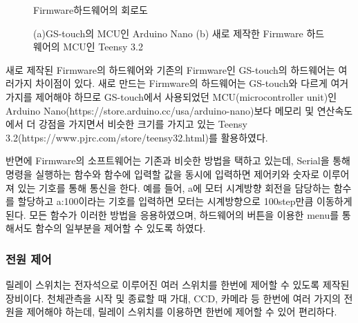 
\begin{figure}[h]
	\begin{center}
	\end{center}
	\caption{Firmware하드웨어의 회로도}
	\label{circuit01}
\end{figure}

\begin{figure}[ht]
	\begin{center}
	\end{center}
\caption{(a)GS-touch의 MCU인 Arduino Nano (b) 새로 제작한 Firmware 하드웨어의 MCU인 Teensy 3.2}
\label{mcu}
\end{figure}

새로 제작된 Firmware의 하드웨어와 기존의 Firmware인 GS-touch의 하드웨어는 여러가지 차이점이 있다. 새로 만드는 Firmware의 하드웨어는 GS-touch와 다르게 여거가지를 제어해야 하므로 GS-touch에서 사용되었던 MCU(microcontroller unit)인 Arduino Nano(https://store.arduino.cc/usa/arduino-nano)보다 메모리 및 연산속도에서 더 강점을 가지면서 비슷한 크기를 가지고 있는 Teensy 3.2(https://www.pjrc.com/store/teensy32.html)를 활용하였다. 

반면에 Firmware의 소프트웨어는 기존과 비슷한 방법을 택하고 있는데, Serial을 통해 명령을 실행하는 함수와 함수에 입력할 값을 동시에 입력하면 제어키와 숫자로 이루어져 있는 기호를 통해 통신을 한다. 예를 들어, a에 모터 시계방향 회전을 담당하는 함수를 할당하고 a:100이라는 기호를 입력하면 모터는 시계방향으로 100step만큼 이동하게 된다. 모든 함수가 이러한 방법을 응용하였으며, 하드웨어의 버튼을 이용한 menu를 통해서도 함수의 일부분을 제어할 수 있도록 하였다.

\subsubsection{전원 제어}

릴레이 스위치는 전자석으로 이루어진 여러 스위치를 한번에 제어할 수 있도록 제작된 장비이다. 천체관측을 시작 및 종료할 때 가대, CCD, 카메라 등 한번에 여러 가지의 전원을 제어해야 하는데, 릴레이 스위치를 이용하면 한번에 제어할 수 있어 편리하다. 

